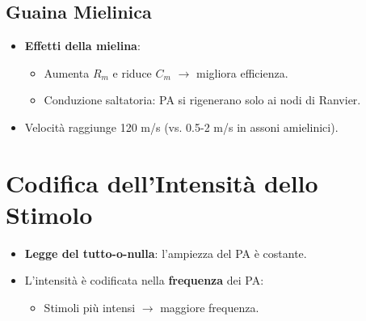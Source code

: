 \documentclass{article}
\begin{document}

\subsection{Guaina Mielinica}
\begin{itemize}
    \item \textbf{Effetti della mielina}:
    \begin{itemize}
        \item Aumenta \(R_m\) e riduce \(C_m\) \(\rightarrow\) migliora efficienza.
        \item Conduzione saltatoria: PA si rigenerano solo ai nodi di Ranvier.
    \end{itemize}
    \item Velocità raggiunge 120 m/s (vs. 0.5-2 m/s in assoni amielinici).
\end{itemize}


\section{Codifica dell'Intensità dello Stimolo}
\begin{itemize}
    \item \textbf{Legge del tutto-o-nulla}: l'ampiezza del PA è costante.
    \item L'intensità è codificata nella \textbf{frequenza} dei PA:
    \begin{itemize}
        \item Stimoli più intensi \(\rightarrow\) maggiore frequenza.
    \end{itemize}
\end{itemize}


\end{document}
